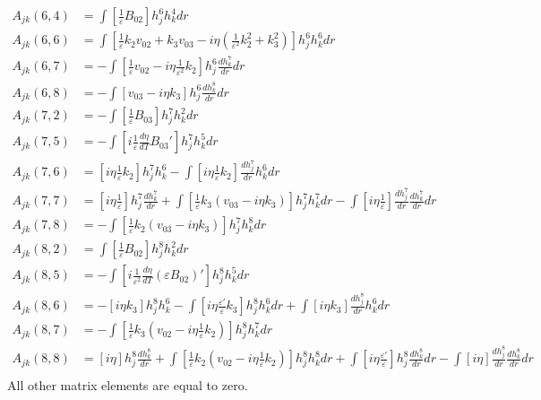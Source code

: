 \documentclass[11pt, fleqn]{article}
\newcommand{\eps}{\varepsilon}
\begin{document}
\begin{align*}
	A_{jk}(6, 4) &=  \int \left[\frac{1}{\eps}B_{02}\right] h_j^6 h_k^4 dr					\\
	A_{jk}(6, 6) &=  \int \left[\frac{1}{\eps}k_2 v_{02} + k_3v_{03} - i\eta\left(\frac{1}{\eps^2}k_2^2 + k_3^2\right)\right] h_j^6 h_k^6 dr	\\
	A_{jk}(6, 7) &= -\int \left[\frac{1}{\eps}v_{02} - i\eta\frac{1}{\eps^2}k_2\right] h_j^6 \frac{dh_k^7}{dr} dr		\\
	A_{jk}(6, 8) &= -\int \left[v_{03} - i\eta k_3\right] h_j^6 \frac{dh_k^8}{dr} dr		\\
	A_{jk}(7, 2) &= -\int \left[\frac{1}{\eps}B_{03}\right] h_j^7 h_k^2 dr					\\
	A_{jk}(7, 5) &= -\int \left[i\frac{1}{\eps}\frac{d\eta}{dT}B_{03}'\right] h_j^7 h_k^5 dr 		\\
	A_{jk}(7, 6) &=  \left[i\eta \frac{1}{\eps} k_2\right] h_j^7 h_k^6 - \int \left[i\eta \frac{1}{\eps} k_2 \right] \frac{dh_j^7}{dr} h_k^6 dr	\\
	A_{jk}(7, 7) &=  \left[i\eta \frac{1}{\eps}\right] h_j^7 \frac{dh_k^7}{dr} + \int \left[\frac{1}{\eps}k_3\left(v_{03} - i\eta k_3\right)\right] h_j^7 h_k^7 dr - \int \left[i\eta \frac{1}{\eps}\right]\frac{dh_j^7}{dr}\frac{dh_k^7}{dr} dr	  \\
	A_{jk}(7, 8) &= -\int \left[\frac{1}{\eps}k_2\left(v_{03} - i\eta k_3\right)\right] h_j^7 h_k^8 dr				\\
	A_{jk}(8, 2) &=  \int \left[\frac{1}{\eps}B_{02}\right] h_j^8 h_k^2 dr					\\
	A_{jk}(8, 5) &= -\int \left[i\frac{1}{\eps^2}\frac{d\eta}{dT}(\eps B_{02})'\right] h_j^8 h_k^5 dr			\\
	A_{jk}(8, 6) &= -\left[i\eta k_3\right] h_j^8 h_k^6 - \int \left[i\eta \frac{\eps'}{\eps}k_3\right] h_j^8 h_k^6 dr + \int \left[i\eta k_3\right] \frac{dh_j^8}{dr} h_k^6 dr			\\
	A_{jk}(8, 7) &= -\int \left[\frac{1}{\eps}k_3\left(v_{02} - i\eta\frac{1}{\eps}k_2\right)\right] h_j^8 h_k^7 dr				\\
	A_{jk}(8, 8) &=  \left[i\eta\right] h_j^8 \frac{dh_k^8}{dr} + \int \left[\frac{1}{\eps}k_2\left(v_{02} - i\eta\frac{1}{\eps}k_2\right)\right] h_j^8 h_k^8 dr + \int \left[i\eta \frac{\eps'}{\eps}\right] h_j^8 \frac{dh_k^8}{dr} dr
							- \int \left[i\eta\right] \frac{dh_j^8}{dr} \frac{dh_k^8}{dr} dr		\\				
\end{align*}
All other matrix elements are equal to zero.
\endgroup
\end{document}
